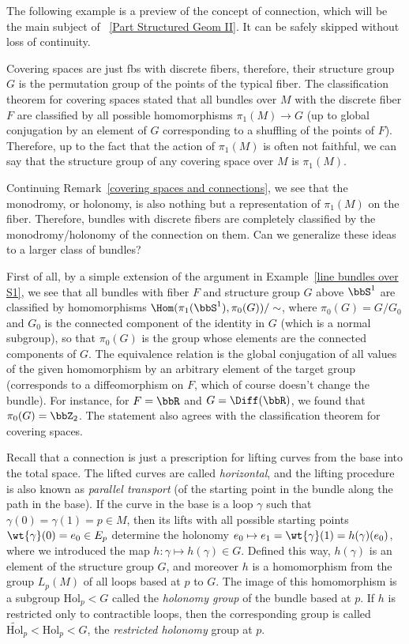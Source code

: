 The following example is a preview of the concept of connection, which will be the main subject of \Part~\ref{Part Structured Geom II}. It can be safely skipped without loss of continuity.

\begin{example}
	Covering spaces are just \glspl{fb} with discrete fibers, therefore, their structure group $G$ is the permutation group of the points of the typical fiber. The classification theorem for covering spaces stated that all bundles over $M$ with the discrete fiber $F$ are classified by all possible homomorphisms $\pi_1(M)\to G$ (up to global conjugation by an element of $G$ corresponding to a shuffling of the points of $F$). Therefore, up to the fact that the action of $\pi_1(M)$ is often not faithful, we can say that the structure group of any covering space over $M$ is $\pi_1(M)$.
	
	Continuing Remark~\ref{covering spaces and connections}, we see that the monodromy, or holonomy, is also nothing but a representation of $\pi_1(M)$ on the fiber. Therefore, bundles with discrete fibers are completely classified by the monodromy/holonomy of the connection on them. Can we generalize these ideas to a larger class of bundles?
	
	First of all, by a simple extension of the argument in Example~\ref{line bundles over S1}, we see  that all bundles with fiber $F$ and structure group $G$ above $\bbS^1$ are classified by homomorphisms $\Hom(\pi_1(\bbS^1),\allowbreak\pi_0(G))/\sim$, where $\pi_0(G)=G/G_0$ and $G_0$ is the connected component of the identity in $G$ (which is a normal subgroup), so that $\pi_0(G)$ is the group whose elements are the connected components of $G$. The equivalence relation is the global conjugation of all values of the given homomorphism by an arbitrary element of the target group (corresponds to a diffeomorphism on $F$, which of course doesn't change the bundle). For instance, for $F=\bbR $ and $G=\Diff(\bbR )$, we found that $\pi_0(G)=\bbZ_2$. The statement also agrees with the classification theorem for covering spaces.
	
	Recall that a connection is just a prescription for lifting curves from the base into the total space. The lifted curves are called \emph{horizontal}, and the lifting procedure is also known as \emph{parallel transport} (of the starting point in the bundle along the path in the base). If the curve in the base is a loop $\gamma$ such that $\gamma(0)=\gamma(1)=p\in M$, then its lifts with all possible starting points $\wt{\gamma}(0)=e_0\in E_p$ determine the holonomy $e_0\mapsto e_1=\wt{\gamma}(1)=h(\gamma)(e_0)$, where we introduced the map $h:\gamma\mapsto h(\gamma)\in G$. Defined this way, $h(\gamma)$ is an element of the structure group $G$, and moreover $h$ is a homomorphism from the group $L_p(M)$ of all loops based at $p$ to $G$. The image of this homomorphism is a subgroup $\mathrm{Hol}_p<G$ called the \emph{holonomy group} of the bundle based at $p$. If $h$ is restricted only to contractible loops, then the corresponding group is called $\widetilde{\mathrm{Hol}}_p<\mathrm{Hol}_p<G$, the \emph{restricted holonomy} group at $p$. 
	

\end{example}
